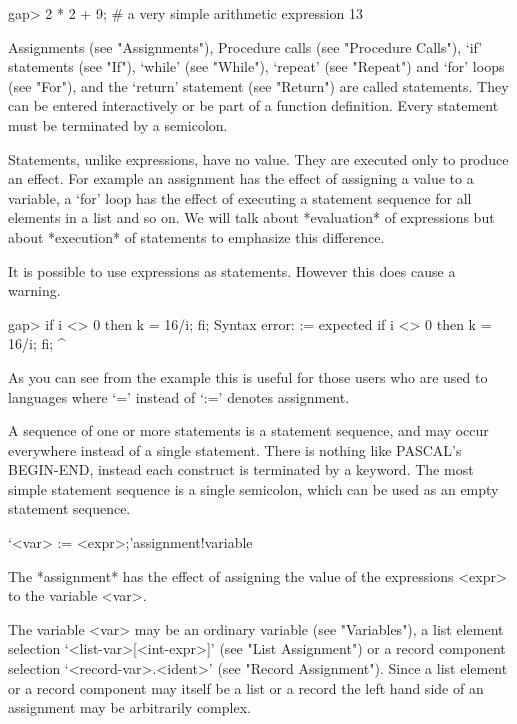 \beginexample
gap> 2 * 2 + 9;  # a very simple arithmetic expression
13
\endexample


Assignments (see "Assignments"), Procedure calls (see "Procedure Calls"),
`if' statements (see "If"), `while' (see "While"), `repeat'  (see
"Repeat") and `for' loops (see "For"), and the `return' statement (see
"Return") are called statements. They can be entered interactively or be
part of a function definition. Every statement must be terminated by a
semicolon.

Statements, unlike expressions, have no value. They are executed only to
produce an effect. For example an assignment has the effect of assigning
a  value to a variable, a `for' loop  has the effect of executing a
statement sequence for all elements in a list and so on. We will talk
about *evaluation* of expressions but about *execution* of statements to
emphasize this difference.

It is possible to use expressions as statements. However this does cause
a warning.

\begintt
gap> if i <> 0 then k = 16/i; fi;
Syntax error: := expected
if i <> 0 then k = 16/i; fi;
                 ^
\endtt

As you can see from the example this is useful for those users who are
used to languages where `=' instead of `:=' denotes assignment.

A sequence of one or more statements is a statement sequence, and may
occur everywhere instead of a single statement. There is nothing like
PASCAL's BEGIN-END, instead each construct is terminated by a keyword.
The most simple statement sequence is a single semicolon, which can be
used as an empty statement sequence.


\>`<var> := <expr>;'{assignment!variable}

The *assignment* has the effect of assigning the value of the expressions
<expr> to the variable <var>.

The variable <var> may be an ordinary variable (see "Variables"), a list
element selection `<list-var>[<int-expr>]' (see "List Assignment") or a
record component  selection  `<record-var>.<ident>'  (see  "Record
Assignment"). Since a list element or a record component may itself be a
list or a record the left hand side of an assignment may be arbitrarily
complex.

